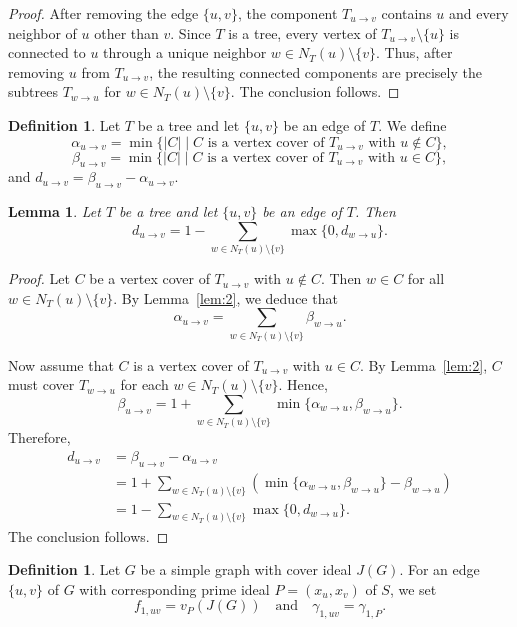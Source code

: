 \documentclass[12pt,amscd]{amsart}
\newtheorem{lem}[thm]{Lemma}
\theoremstyle{definition}
\newtheorem{defn}[thm]{Definition}
\numberwithin{equation}{section}
\begin{document}
\begin{proof}
After removing the edge $\{u,v\}$, the component $T_{u\to v}$ contains
$u$ and every neighbor of $u$ other than $v$. Since $T$ is a tree, every
vertex of $T_{u\to v}\setminus\{u\}$ is connected to $u$ through a
unique neighbor $w\in N_T(u)\setminus\{v\}$. Thus, after removing $u$
from $T_{u\to v}$, the resulting connected components are precisely
the subtrees $T_{w\to u}$ for
$w\in N_T(u)\setminus\{v\}$. The conclusion follows.
\end{proof}

\begin{defn}
Let $T$ be a tree and let $\{u,v\}$ be an edge of $T$. We define 
\[
\alpha_{u \to v} = \min \{ |C| \mid C \text{ is a vertex cover of } T_{u \to v} \text{ with } u \notin C \},
\]
\[
\beta_{u \to v} = \min \{ |C| \mid C \text{ is a vertex cover of } T_{u \to v} \text{ with } u \in C \},
\]
and $d_{u \to v} = \beta_{u \to v} - \alpha_{u \to v}$.
\end{defn}

\begin{lem} \label{lem:3} 
Let $T$ be a tree and let $\{u,v\}$ be an edge of $T$. Then 
\[
d_{u \to v} = 1 - \sum_{w \in N_T(u) \setminus \{v\}} \max \{ 0, d_{w \to u} \}.
\]
\end{lem}

\begin{proof} 
Let $C$ be a vertex cover of $T_{u \to v}$ with $u \notin C$. Then $w \in C$ for all $w \in N_T(u) \setminus \{v\}$. By Lemma~\ref{lem:2}, we deduce that 
\[
\alpha_{u \to v} = \sum_{w \in N_T(u) \setminus \{v\}} \beta_{w \to u}.
\]

Now assume that $C$ is a vertex cover of $T_{u \to v}$ with $u \in C$. By Lemma~\ref{lem:2}, $C$ must cover $T_{w \to u}$ for each $w \in N_T(u) \setminus \{v\}$. Hence, 
\[
\beta_{u \to v} = 1 + \sum_{w \in N_T(u) \setminus \{v\}} \min \{ \alpha_{w \to u}, \beta_{w \to u} \}.
\]
Therefore, 
\begin{align*}
d_{u \to v} &= \beta_{u \to v} - \alpha_{u \to v} \\
&= 1 + \sum_{w \in N_T(u) \setminus \{v\}} (\min \{ \alpha_{w \to u}, \beta_{w \to u} \} - \beta_{w \to u}) \\
&= 1 - \sum_{w \in N_T(u) \setminus \{v\}} \max \{ 0, d_{w \to u} \}.
\end{align*}
The conclusion follows.
\end{proof}

\begin{defn}
Let $G$ be a simple graph with cover ideal $J(G)$. For an edge $\{u,v\}$ of $G$ with corresponding prime ideal $P = (x_u, x_v)$ of $S$, we set 
\[
f_{1,uv} = v_P(J(G)) \quad \text{and} \quad \gamma_{1,uv} = \gamma_{1,P}.
\]
\end{defn}
\end{document}
